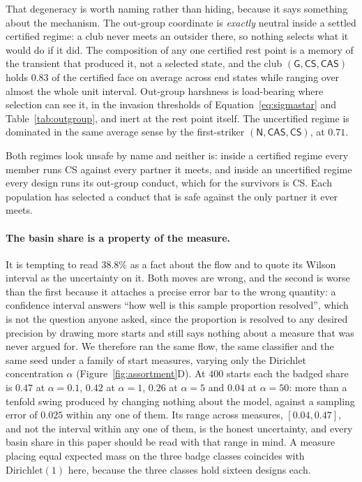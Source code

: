 \documentclass[11pt,a4paper]{article}
\theoremstyle{definition}
\newcommand{\CS}{\textsf{CS}}
\newcommand{\CAS}{\textsf{CAS}}
\begin{document}
That degeneracy is worth naming rather than hiding, because it says something
about the mechanism. The out-group coordinate is \emph{exactly} neutral inside
a settled certified regime: a club never meets an outsider there, so nothing
selects what it would do if it did. The composition of any one certified rest
point is a memory of the transient that produced it, not a selected state, and
the club $(\mathsf{G}, \CS, \CAS)$ holds $0.83$ of the certified face on
average across end states while ranging over almost the whole unit interval.
Out-group harshness is load-bearing where selection can see it, in the invasion
thresholds of Equation~\eqref{eq:sigmastar} and Table~\ref{tab:outgroup}, and
inert at the rest point itself. The uncertified regime is dominated in the same
average sense by the first-striker $(\mathsf{N}, \CAS, \CS)$, at $0.71$.

Both regimes look unsafe by name and neither is: inside a certified regime
every member runs \CS{} against every partner it meets, and inside an
uncertified regime every design runs its out-group conduct, which for the
survivors is \CS{}. Each population has selected a conduct that is safe against
the only partner it ever meets.

\paragraph{The basin share is a property of the measure.}
It is tempting to read $38.8\%$ as a fact about the flow and to quote its
Wilson interval as the uncertainty on it. Both moves are wrong, and the second
is worse than the first because it attaches a precise error bar to the wrong
quantity: a confidence interval answers ``how well is this sample proportion
resolved'', which is not the question anyone asked, since the proportion is
resolved to any desired precision by drawing more starts and still says nothing
about a measure that was never argued for. We therefore ran the same flow, the
same classifier and the same seed under a family of start measures, varying
only the Dirichlet concentration $\alpha$ (Figure~\ref{fig:assortment}D). At
$400$ starts each the badged share is $0.47$ at $\alpha = 0.1$, $0.42$ at
$\alpha = 1$, $0.26$ at $\alpha = 5$ and $0.04$ at $\alpha = 50$: more than a
tenfold swing produced by changing nothing about the model, against a sampling
error of $0.025$ within any one of them. Its range
across measures, $[0.04, 0.47]$, and not the interval within any one of them,
is the honest uncertainty, and every basin share in this paper should be read
with that range in mind. A measure placing equal expected mass on the three
badge classes coincides with $\mathrm{Dirichlet}(1)$ here, because the three
classes hold sixteen designs each.
\end{document}
